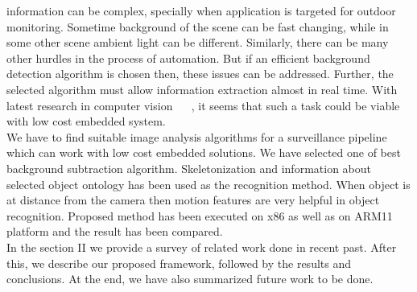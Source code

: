 \documentclass[conference]{IEEEtran}
\begin{document}
information can be complex, specially when application is targeted for
outdoor monitoring. Sometime background of the scene can be fast
changing, while in some other scene ambient light can be different.
Similarly, there can be many other hurdles in the process of automation.
But if an efficient background detection algorithm is chosen then, these
issues can be addressed. Further, the selected algorithm must allow
information extraction almost in real time. With latest research in
computer vision ~\cite{3} ~\cite{5}, it seems that such a task could be
viable with low cost embedded system.\\
\indent We have to find suitable image analysis algorithms for a
surveillance pipeline which can work with low cost embedded solutions.
We have selected one of best ~\cite{5} background subtraction algorithm.
Skeletonization and information about selected object ontology
has been used as the recognition method. When object is at distance from
the camera then motion features are very helpful in object recognition.
Proposed method has been executed on x86 as well as on ARM11 platform
and the result has been compared. \\
\indent In the  section II we provide a survey of related work done in
recent past. After this, we describe our proposed framework, followed by
the results and conclusions.  At the end, we have also summarized future
work to be done.
\end{document}
